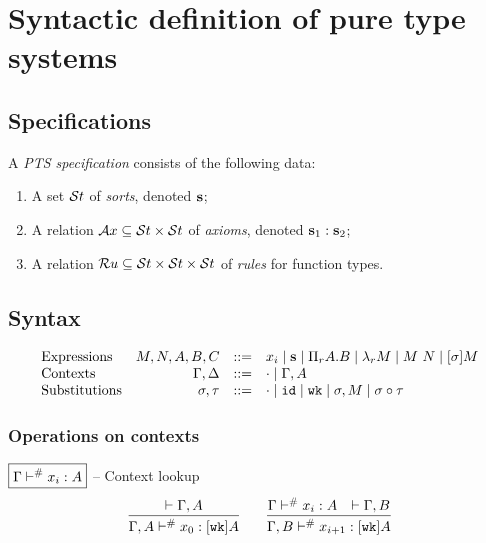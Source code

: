 \section{Syntactic definition of pure type systems}
\label{app:pts-syntax}

\subsection{Specifications}
\begin{definition}
  A \textit{\ac{PTS} specification} consists of the following data:
  \begin{enumerate}
  \item A set $\mathcal{S}t$ of \textit{sorts}, denoted $\textbf{s}$;
  \item A relation $\mathcal{A}x \subseteq \mathcal{S}t \times \mathcal{S}t$ of \textit{axioms}, denoted $\textbf{s}_1 : \textbf{s}_2$;
  \item A relation $\mathcal{R}u \subseteq \mathcal{S}t \times \mathcal{S}t \times \mathcal{S}t$ of \textit{rules} for function types.
  \end{enumerate}
\end{definition}

\subsection{Syntax}

\[
\begin{array}{lrcl}
  \mbox{Expressions}       & M,N,A,B,C      & ::=  & x_i \mid \tmcst s \mid \tppi A B \mid \tmlam M \mid \tmapp M N \mid \tmclo \sigma M \\
  \mbox{Contexts}          & \Gamma, \Delta & ::=  & \ctxempty \mid \ctxext\Gamma A \\
  \mbox{Substitutions}     & \sigma, \tau   & ::=  & \subempty \mid\subid \mid \subwk \mid \subext \sigma M \mid \subclo \sigma \tau
\end{array}
\]

\subsubsection{Operations on contexts}

\noindent
$\boxed{\ctxlookup \Gamma {x_i} A}$ -- Context lookup
\[
\begin{array}{c}
  \infer{
    \ctxlookup {\ctxext \Gamma A} {x_0} {\tmclo \subwk A}
  }{
    \wfctx {\ctxext \Gamma A}
  }
  \qquad
  \infer{
    \ctxlookup {\ctxext \Gamma B} {x_{i+1}} {\tmclo \subwk A}
  }{
    \ctxlookup \Gamma {x_i} A
    &
    \wfctx {\ctxext \Gamma B}
  }
\end{array}
\]

